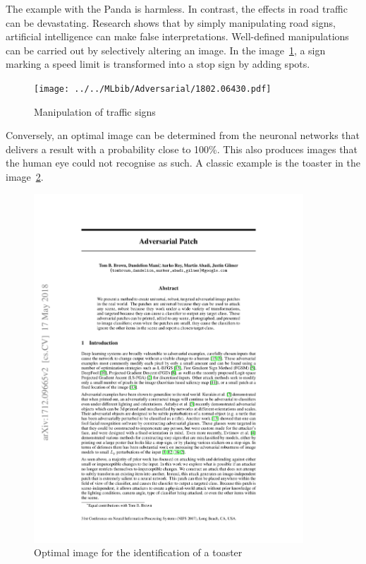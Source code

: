 The example with the Panda is harmless. In contrast, the effects in road traffic can be devastating. Research shows that by simply manipulating road signs, artificial intelligence can make false interpretations. \cite{Sitawarin:2018} Well-defined manipulations can be carried out by selectively altering an image. In the image~\ref{Adversarial:Stop}, a sign marking a speed limit is transformed into a stop sign by adding spots. 



\begin{figure}
  \centering
  \texttt{[image: ../../MLbib/Adversarial/1802.06430.pdf]}
    
  \caption{Manipulation of traffic signs  \cite{Sitawarin:2018}}\label{Adversarial:Stop}
\end{figure}

Conversely, an optimal image can be determined from the neuronal networks that delivers a result with a probability close to 100\%. This also produces images that the human eye could not recognise as such. A classic example is the toaster in the image~\ref{Adversarial:Toaster}.\cite{Brown:2017}


\begin{figure}
    \includegraphics[page=2,width=0.9\textwidth,viewport=20 470 560 900,clip]{../../MLbib/Adversarial/1712.09665.pdf}
    
    \caption{Optimal image for the identification of a toaster  \cite{Sitawarin:2018}}\label{Adversarial:Toaster}
\end{figure}

